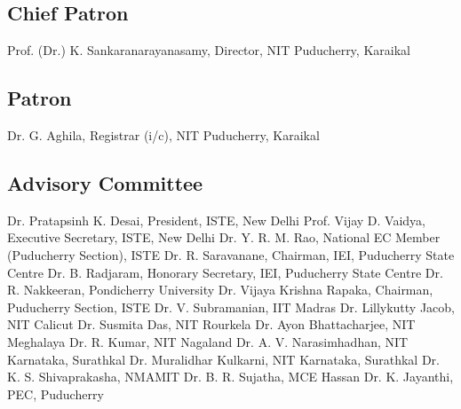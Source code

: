 \documentclass[12pt,a3paper, foldmark,notumble]{leaflet}
\begin{document}
\subsection{Chief Patron}
\vspace{-0.20cm}
Prof. (Dr.) K. Sankaranarayanasamy, Director, NIT Puducherry, Karaikal\newline
\vspace{-0.85cm}
\subsection{Patron}
\vspace{-0.20cm}
Dr. G. Aghila, Registrar (i/c), NIT Puducherry, Karaikal\newline 
\vspace{-0.85cm}
\subsection{Advisory Committee}
\vspace{-0.20cm}
Dr. Pratapsinh K. Desai, President, ISTE, New Delhi \newline
Prof. Vijay D. Vaidya, Executive Secretary, ISTE, New Delhi \newline
Dr. Y. R. M. Rao, National EC Member (Puducherry Section), ISTE \newline
Dr. R. Saravanane, Chairman, IEI, Puducherry State Centre \newline
Dr. B. Radjaram, Honorary Secretary, IEI, Puducherry State Centre \newline
Dr. R. Nakkeeran, Pondicherry University \newline
Dr. Vijaya Krishna Rapaka, Chairman, Puducherry Section, ISTE \newline
Dr. V. Subramanian, IIT Madras \newline
Dr. Lillykutty Jacob, NIT Calicut \newline
Dr. Susmita Das, NIT Rourkela \newline
Dr. Ayon Bhattacharjee, NIT Meghalaya \newline
Dr. R. Kumar, NIT Nagaland \newline
Dr. A. V. Narasimhadhan, NIT Karnataka, Surathkal \newline 
Dr. Muralidhar Kulkarni, NIT Karnataka, Surathkal \newline
Dr. K. S. Shivaprakasha, NMAMIT \newline
Dr. B. R. Sujatha, MCE Hassan \newline
Dr. K. Jayanthi, PEC, Puducherry\newline
\end{document}
